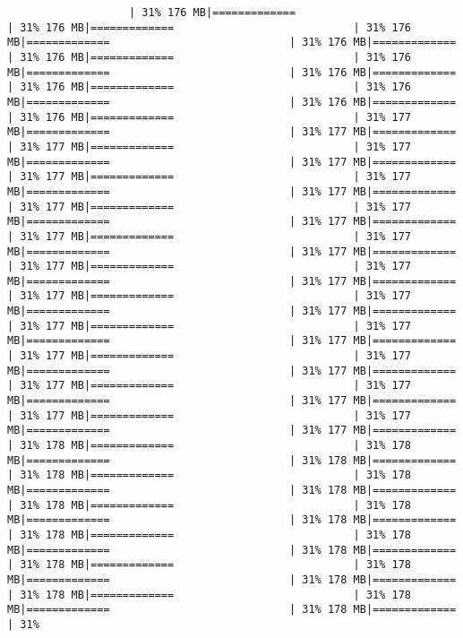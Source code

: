 \documentclass[
]{article}
\begin{document}
\begin{verbatim}
                   | 31% 176 MB|=============                            | 31% 176 MB|=============                            | 31% 176 MB|=============                            | 31% 176 MB|=============                            | 31% 176 MB|=============                            | 31% 176 MB|=============                            | 31% 176 MB|=============                            | 31% 176 MB|=============                            | 31% 176 MB|=============                            | 31% 176 MB|=============                            | 31% 176 MB|=============                            | 31% 177 MB|=============                            | 31% 177 MB|=============                            | 31% 177 MB|=============                            | 31% 177 MB|=============                            | 31% 177 MB|=============                            | 31% 177 MB|=============                            | 31% 177 MB|=============                            | 31% 177 MB|=============                            | 31% 177 MB|=============                            | 31% 177 MB|=============                            | 31% 177 MB|=============                            | 31% 177 MB|=============                            | 31% 177 MB|=============                            | 31% 177 MB|=============                            | 31% 177 MB|=============                            | 31% 177 MB|=============                            | 31% 177 MB|=============                            | 31% 177 MB|=============                            | 31% 177 MB|=============                            | 31% 177 MB|=============                            | 31% 177 MB|=============                            | 31% 177 MB|=============                            | 31% 177 MB|=============                            | 31% 177 MB|=============                            | 31% 177 MB|=============                            | 31% 177 MB|=============                            | 31% 177 MB|=============                            | 31% 177 MB|=============                            | 31% 177 MB|=============                            | 31% 177 MB|=============                            | 31% 177 MB|=============                            | 31% 177 MB|=============                            | 31% 178 MB|=============                            | 31% 178 MB|=============                            | 31% 178 MB|=============                            | 31% 178 MB|=============                            | 31% 178 MB|=============                            | 31% 178 MB|=============                            | 31% 178 MB|=============                            | 31% 178 MB|=============                            | 31% 178 MB|=============                            | 31% 178 MB|=============                            | 31% 178 MB|=============                            | 31% 178 MB|=============                            | 31% 178 MB|=============                            | 31% 178 MB|=============                            | 31% 178 MB|=============                            | 31% 178 MB|=============                            | 31% 178 MB|=============                            | 31% 178 MB|=============                            | 31% 
\end{verbatim}
\end{document}
